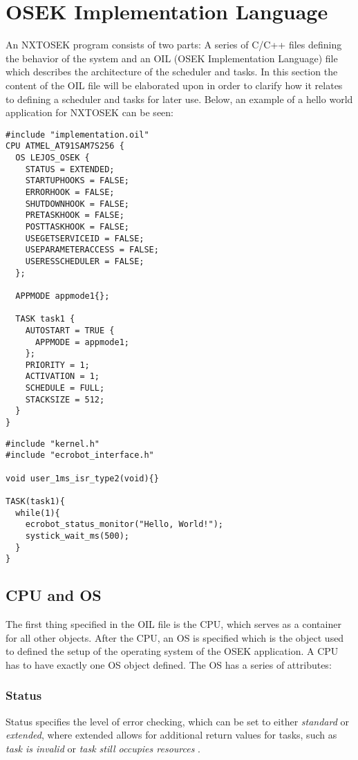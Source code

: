 
\section{OSEK Implementation Language}
An NXTOSEK program consists of two parts: A series of C/C++ files defining the behavior of the system and an OIL (OSEK Implementation Language) file which describes the architecture of the scheduler and tasks.
In this section the content of the OIL file will be elaborated upon in order to clarify how it relates to defining a scheduler and tasks for later use.
Below, an example of a hello world application for NXTOSEK can be seen:
\begin{lstlisting}[caption=OIL]
#include "implementation.oil"
CPU ATMEL_AT91SAM7S256 {
  OS LEJOS_OSEK {
    STATUS = EXTENDED;
    STARTUPHOOKS = FALSE;
    ERRORHOOK = FALSE;
    SHUTDOWNHOOK = FALSE;
    PRETASKHOOK = FALSE;
    POSTTASKHOOK = FALSE;
    USEGETSERVICEID = FALSE;
    USEPARAMETERACCESS = FALSE;
    USERESSCHEDULER = FALSE;
  };
  
  APPMODE appmode1{};

  TASK task1 {
    AUTOSTART = TRUE {
      APPMODE = appmode1;    
    };
    PRIORITY = 1;
    ACTIVATION = 1;
    SCHEDULE = FULL;
    STACKSIZE = 512;
  }
}
\end{lstlisting}

\begin{lstlisting}[caption=C source]
#include "kernel.h"
#include "ecrobot_interface.h"

void user_1ms_isr_type2(void){}

TASK(task1){
  while(1){
    ecrobot_status_monitor("Hello, World!");
    systick_wait_ms(500);
  }
}
\end{lstlisting}

\subsection{CPU and OS}
The first thing specified in the OIL file is the CPU, which serves as a container for all other objects\cite{irisa25}.
After the CPU, an OS is specified which is the object used to defined the setup of the operating system of the OSEK application.
A CPU has to have exactly one OS object defined.
The OS has a series of attributes: 
\subsubsection*{Status}
Status specifies the level of error checking, which can be set to either \textit{standard} or \textit{extended}, where extended allows for additional return values for tasks, such as \textit{task is invalid} or \textit{task still occupies resources} \cite{irisa223}.\\

